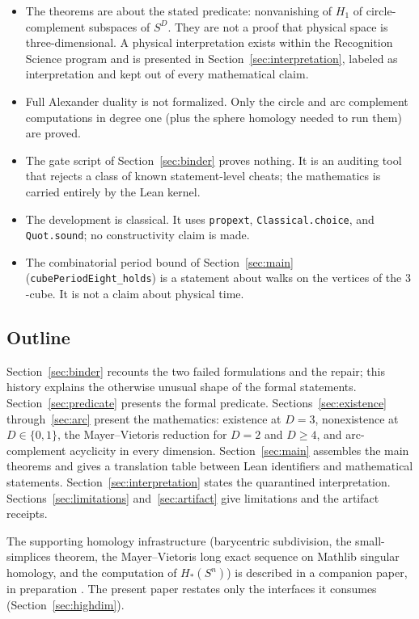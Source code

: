 \documentclass[11pt]{article}
\theoremstyle{definition}
\newcommand{\Sph}[1]{S^{#1}}
\newcommand{\lean}[1]{\texttt{#1}}
\begin{document}
\begin{itemize}
\item The theorems are about the stated predicate: nonvanishing of $H_1$ of circle-complement subspaces of $\Sph{D}$. They are not a proof that physical space is three-dimensional. A physical interpretation exists within the Recognition Science program and is presented in Section~\ref{sec:interpretation}, labeled as interpretation and kept out of every mathematical claim.
\item Full Alexander duality is not formalized. Only the circle and arc complement computations in degree one (plus the sphere homology needed to run them) are proved.
\item The gate script of Section~\ref{sec:binder} proves nothing. It is an auditing tool that rejects a class of known statement-level cheats; the mathematics is carried entirely by the Lean kernel.
\item The development is classical. It uses \lean{propext}, \lean{Classical.choice}, and \lean{Quot.sound}; no constructivity claim is made.
\item The combinatorial period bound of Section~\ref{sec:main} (\lean{cubePeriodEight\_holds}) is a statement about walks on the vertices of the $3$-cube. It is not a claim about physical time.
\end{itemize}

\subsection{Outline}

Section~\ref{sec:binder} recounts the two failed formulations and the repair; this history explains the otherwise unusual shape of the formal statements. Section~\ref{sec:predicate} presents the formal predicate. Sections~\ref{sec:existence} through~\ref{sec:arc} present the mathematics: existence at $D=3$, nonexistence at $D \in \{0,1\}$, the Mayer--Vietoris reduction for $D=2$ and $D \geq 4$, and arc-complement acyclicity in every dimension. Section~\ref{sec:main} assembles the main theorems and gives a translation table between Lean identifiers and mathematical statements. Section~\ref{sec:interpretation} states the quarantined interpretation. Sections~\ref{sec:limitations} and~\ref{sec:artifact} give limitations and the artifact receipts.

The supporting homology infrastructure (barycentric subdivision, the small-simplices theorem, the Mayer--Vietoris long exact sequence on Mathlib singular homology, and the computation of $H_*(\Sph{n})$) is described in a companion paper, in preparation \cite{companion}. The present paper restates only the interfaces it consumes (Section~\ref{sec:highdim}).
\end{document}
